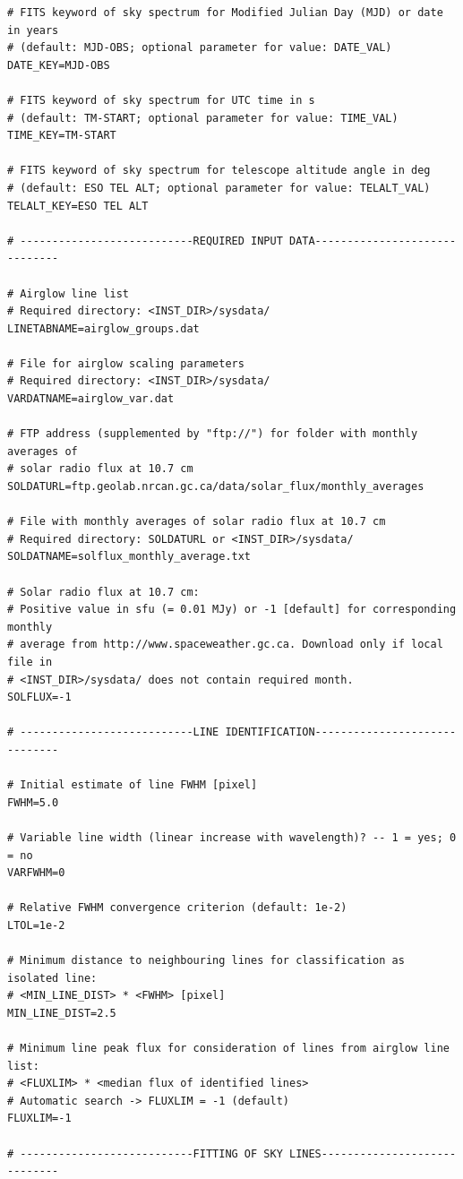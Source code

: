 {\begin{verbatim}
# FITS keyword of sky spectrum for Modified Julian Day (MJD) or date in years
# (default: MJD-OBS; optional parameter for value: DATE_VAL)
DATE_KEY=MJD-OBS

# FITS keyword of sky spectrum for UTC time in s
# (default: TM-START; optional parameter for value: TIME_VAL)
TIME_KEY=TM-START

# FITS keyword of sky spectrum for telescope altitude angle in deg
# (default: ESO TEL ALT; optional parameter for value: TELALT_VAL)
TELALT_KEY=ESO TEL ALT

# ---------------------------REQUIRED INPUT DATA------------------------------

# Airglow line list
# Required directory: <INST_DIR>/sysdata/
LINETABNAME=airglow_groups.dat

# File for airglow scaling parameters
# Required directory: <INST_DIR>/sysdata/
VARDATNAME=airglow_var.dat

# FTP address (supplemented by "ftp://") for folder with monthly averages of
# solar radio flux at 10.7 cm
SOLDATURL=ftp.geolab.nrcan.gc.ca/data/solar_flux/monthly_averages

# File with monthly averages of solar radio flux at 10.7 cm
# Required directory: SOLDATURL or <INST_DIR>/sysdata/
SOLDATNAME=solflux_monthly_average.txt

# Solar radio flux at 10.7 cm:
# Positive value in sfu (= 0.01 MJy) or -1 [default] for corresponding monthly
# average from http://www.spaceweather.gc.ca. Download only if local file in
# <INST_DIR>/sysdata/ does not contain required month.
SOLFLUX=-1

# ---------------------------LINE IDENTIFICATION------------------------------

# Initial estimate of line FWHM [pixel]
FWHM=5.0

# Variable line width (linear increase with wavelength)? -- 1 = yes; 0 = no
VARFWHM=0

# Relative FWHM convergence criterion (default: 1e-2)
LTOL=1e-2

# Minimum distance to neighbouring lines for classification as isolated line:
# <MIN_LINE_DIST> * <FWHM> [pixel]
MIN_LINE_DIST=2.5

# Minimum line peak flux for consideration of lines from airglow line list:
# <FLUXLIM> * <median flux of identified lines>
# Automatic search -> FLUXLIM = -1 (default)
FLUXLIM=-1

# ---------------------------FITTING OF SKY LINES-----------------------------


\end{verbatim}}
